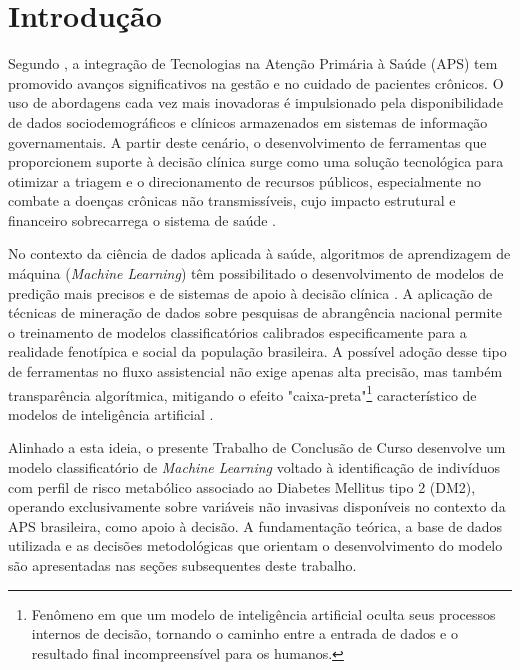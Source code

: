 \chapter{Introdução}
Segundo , a integração de Tecnologias na Atenção Primária à Saúde (APS) tem promovido avanços significativos na gestão e no cuidado de pacientes crônicos. O uso de abordagens cada vez mais inovadoras é impulsionado pela disponibilidade de dados sociodemográficos e clínicos armazenados em sistemas de informação governamentais. A partir deste cenário, o desenvolvimento de ferramentas que proporcionem suporte à decisão clínica surge como uma solução tecnológica para otimizar a triagem e o direcionamento de recursos públicos, especialmente no combate a doenças crônicas não transmissíveis, cujo impacto estrutural e financeiro sobrecarrega o sistema de saúde \cite{bezerra2025morbidade}.

No contexto da ciência de dados aplicada à saúde, algoritmos de aprendizagem de máquina (\textit{Machine Learning}) têm possibilitado o desenvolvimento de modelos de predição mais precisos e de sistemas de apoio à decisão clínica \cite{islam2024comprehensive}. A aplicação de técnicas de mineração de dados sobre pesquisas de abrangência nacional permite o treinamento de modelos classificatórios calibrados especificamente para a realidade fenotípica e social da população brasileira. A possível adoção desse tipo de ferramentas no fluxo assistencial não exige apenas alta precisão, mas também transparência algorítmica, mitigando o efeito "caixa-preta"\footnote{Fenômeno em que um modelo de inteligência artificial oculta seus processos internos de decisão, tornando o caminho entre a entrada de dados e o resultado final incompreensível para os humanos.} característico de modelos de inteligência artificial \cite{salih2025perspective}.

Alinhado a esta ideia, o presente Trabalho de Conclusão de Curso desenvolve um modelo classificatório de \textit{Machine Learning} voltado à identificação de indivíduos com perfil de risco metabólico associado ao Diabetes Mellitus tipo 2 (DM2), operando exclusivamente sobre variáveis não invasivas disponíveis no contexto da APS brasileira, como apoio à decisão. A fundamentação teórica, a base de dados utilizada e as decisões metodológicas que orientam o desenvolvimento do modelo são apresentadas nas seções subsequentes deste trabalho.

